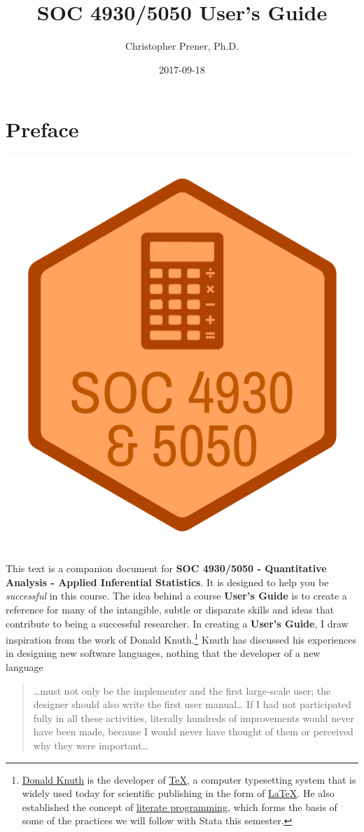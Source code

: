 \documentclass[]{book}
\title{SOC 4930/5050 User's Guide}
\author{Christopher Prener, Ph.D.}
\date{2017-09-18}
\let\rmarkdownfootnote\footnote%
\def\footnote{\protect\rmarkdownfootnote}
\theoremstyle{definition}
\theoremstyle{definition}
\theoremstyle{definition}
\theoremstyle{remark}
\begin{document}
\maketitle

{
\setcounter{tocdepth}{1}
\tableofcontents
}
\chapter*{Preface}\label{preface}

\begin{center}\includegraphics[width=0.5\linewidth]{images/soc5050Logo} \end{center}

This text is a companion document for \textbf{SOC 4930/5050 -
Quantitative Analysis - Applied Inferential Statistics}. It is designed
to help you be \emph{successful} in this course. The idea behind a
course \textbf{User's Guide} is to create a reference for many of the
intangible, subtle or disparate skills and ideas that contribute to
being a successful researcher. In creating a \textbf{User's Guide}, I
draw inspiration from the work of Donald Knuth.\footnote{\href{https://en.wikipedia.org/wiki/Donald_Knuth}{Donald
  Knuth} is the developer of
  \href{https://en.wikipedia.org/wiki/TeX}{TeX}, a computer typesetting
  system that is widely used today for scientific publishing in the form
  of \href{https://en.wikipedia.org/wiki/LaTeX}{LaTeX}. He also
  established the concept of
  \href{https://en.wikipedia.org/wiki/Literate_programming}{literate
  programming}, which forms the basis of some of the practices we will
  follow with Stata this semester.} Knuth has discussed his experiences
in designing new software languages, nothing that the developer of a new
language

\begin{quote}
\ldots{}must not only be the implementer and the first large-scale user;
the designer should also write the first user manual\ldots{} If I had
not participated fully in all these activities, literally hundreds of
improvements would never have been made, because I would never have
thought of them or perceived why they were important\ldots{}
\end{quote}
\end{document}
